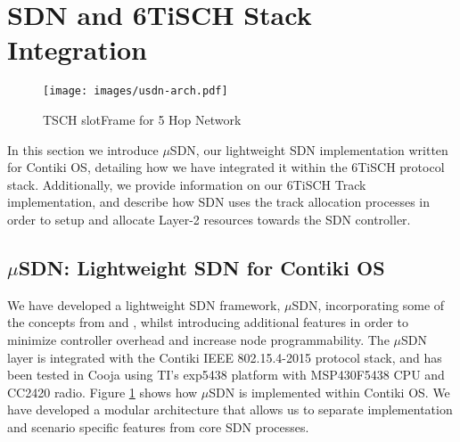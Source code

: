 
\section{SDN and 6TiSCH Stack Integration}
\label{sec_approach}

\begin{figure}[ht]
\centering
  \texttt{[image: images/usdn-arch.pdf]}
  \caption{TSCH slotFrame for 5 Hop Network}
  \label{fig:usdn_arch}
\end{figure}

In this section we introduce $\mu$SDN, our lightweight SDN implementation written for Contiki OS, detailing how we have integrated it within the 6TiSCH protocol stack. Additionally, we provide information on our 6TiSCH Track implementation, and describe how SDN uses the track allocation processes in order to setup and allocate Layer-2 resources towards the SDN controller.

\subsection{$\mu$SDN: Lightweight SDN for Contiki OS}
We have developed a lightweight SDN framework, $\mu$SDN, incorporating some of the concepts from \cite{sensor_openflow} and \cite{sdwn}, whilst introducing additional features in order to minimize controller overhead and increase node programmability. The $\mu$SDN layer is integrated with the Contiki IEEE 802.15.4-2015 protocol stack, and has been tested in Cooja using TI's exp5438 platform with MSP430F5438 CPU and CC2420 radio. Figure \ref{fig:usdn_arch} shows how $\mu$SDN is implemented within Contiki OS. We have developed a modular architecture that allows us to separate implementation and scenario specific features from core SDN processes.

